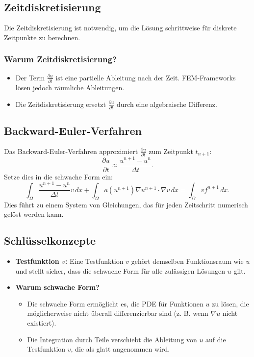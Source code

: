 \subsection{Zeitdiskretisierung}
Die Zeitdiskretisierung ist notwendig, um die Lösung schrittweise für diskrete Zeitpunkte zu berechnen.

\subsubsection{Warum Zeitdiskretisierung?}
\begin{itemize}
	\item Der Term $\frac{\partial u}{\partial t}$ ist eine partielle Ableitung nach der Zeit. FEM-Frameworks lösen jedoch räumliche Ableitungen.
	\item Die Zeitdiskretisierung ersetzt $\frac{\partial u}{\partial t}$ durch eine algebraische Differenz.
\end{itemize}

\subsection{Backward-Euler-Verfahren}
Das Backward-Euler-Verfahren approximiert $\frac{\partial u}{\partial t}$ zum Zeitpunkt $t_{n+1}$:
\begin{equation}
	\frac{\partial u}{\partial t} \approx \frac{u^{n+1} - u^n}{\Delta t}.
\end{equation}
Setze dies in die schwache Form ein:
\begin{equation}
	\int_\Omega \frac{u^{n+1} - u^n}{\Delta t} v \, dx + \int_\Omega a(u^{n+1}) \nabla u^{n+1} \cdot \nabla v \, dx = \int_\Omega v f^{n+1} \, dx.
\end{equation}
Dies führt zu einem System von Gleichungen, das für jeden Zeitschritt numerisch gelöst werden kann.

\subsection{Schlüsselkonzepte}
\begin{itemize}
	\item \textbf{Testfunktion $v$:} Eine Testfunktion $v$ gehört demselben Funktionsraum wie $u$ und stellt sicher, dass die schwache Form für alle zulässigen Lösungen $u$ gilt.
	\item \textbf{Warum schwache Form?}
	\begin{itemize}
		\item Die schwache Form ermöglicht es, die PDE für Funktionen $u$ zu lösen, die möglicherweise nicht überall differenzierbar sind (z. B. wenn $\nabla u$ nicht existiert).
		\item Die Integration durch Teile verschiebt die Ableitung von $u$ auf die Testfunktion $v$, die als glatt angenommen wird.
	\end{itemize}
\end{itemize}


